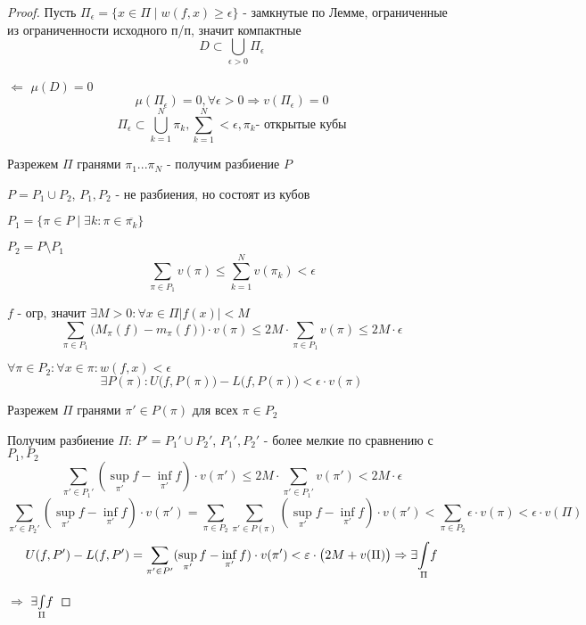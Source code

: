     \begin{proof}
        \par Пусть $\Pi_\epsilon = \{x \in \Pi \mid w(f,x) \ge \epsilon \}$ - замкнутые по Лемме, ограниченные из ограниченности исходного п/п, значит компактные
        $$D \subset \bigcup_{\epsilon > 0} \Pi_\epsilon$$
        \bigskip
        \par $\boxed{\Leftarrow}$ $\mu(D) = 0$ 
        $$\mu(\Pi_\epsilon) = 0, \forall \epsilon>0 \Rightarrow v(\Pi_\epsilon) = 0$$
        $$\Pi_\epsilon \subset \bigcup\limits_{k=1}^N \pi_k, \sum\limits_{k=1}^N < \epsilon, \pi_k \text {- открытые кубы}$$
        \par Разрежем $\Pi$ гранями $\pi_1 ... \pi_N$ - получим разбиение $P$
        \par $P = P_1 \cup P_2$, $P_1, P_2$ - не разбиения, но состоят из кубов
        \par $P_1 = \{\pi \in P \mid \exists k: \pi \in \overline{\pi_k} \}$
        \par $P_2 = P \setminus P_1$
        $$\sum\limits_{\pi \in P_1} v(\pi) \le \sum\limits_{k=1}^N v(\pi_k) < \epsilon$$
        \bigskip
        \par $f$ - огр, значит $\exists M>0: \forall x \in \Pi |f(x)| < M$
        $$\sum\limits_{\pi \in P_1} \big(M_\pi(f) - m_\pi(f)\big) \cdot v(\pi) \le 2M \cdot \sum\limits_{\pi \in P_1} v(\pi) \le 2M \cdot \epsilon$$
        \bigskip
        \par $\forall \pi \in P_2: \forall x\in \pi: w(f, x) < \epsilon$
        $$\exists P(\pi): U\big(f, P(\pi)\big) - L\big(f, P(\pi)\big) < \epsilon \cdot v(\pi)$$
        \par Разрежем $\Pi$ гранями $\pi' \in P(\pi)$ для всех $\pi \in P_2$
        \par Получим разбиение $\Pi$: $P' = P_1' \cup P_2'$, $P_1', P_2'$ - более мелкие по сравнению с $P_1, P_2$
        $$\sum\limits_{\pi' \in P_1'} (\sup_{\pi'} f - \inf_{\pi'} f)\cdot v(\pi') \le 2M \cdot \sum\limits_{\pi' \in P_1'} v(\pi') < 2M \cdot \epsilon$$
        \bigskip
        $$\sum\limits_{\pi' \in P_2'} (\sup_{\pi'} f - \inf_{\pi'} f) \cdot v(\pi') = \sum\limits_{\pi \in P_2} \sum\limits_{\pi' \in P(\pi)} (\sup_{\pi'} f - \inf_{\pi'} f) \cdot v(\pi') < \sum\limits_{\pi \in P_2} \epsilon \cdot v(\pi) < \epsilon \cdot v(\Pi)$$
        \bigskip
        $$U(f, P') - L(f, P') = \sum\limits_{\pi' \in P'} (\sup_{\pi'} f - \inf_{\pi'} f) \cdot v(\pi') < \varepsilon \cdot \big(2M + v(\Pi)\big) \Rightarrow \exists \underset{\Pi}{\int} f$$
        \bigskip
        \par $\boxed{\Rightarrow}$ $\exists \underset{\Pi}{\int} f$

\end{proof}

